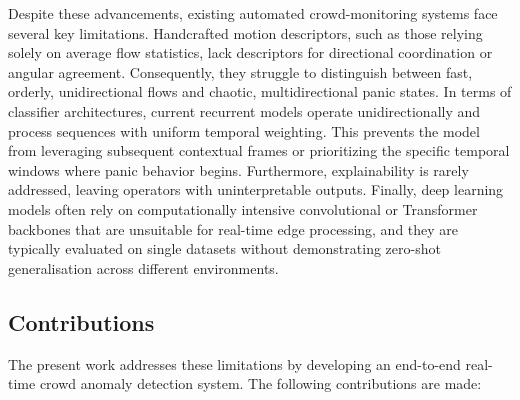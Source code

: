 Despite these advancements, existing automated crowd-monitoring systems face several key limitations. Handcrafted motion descriptors, such as those relying solely on average flow statistics, lack descriptors for directional coordination or angular agreement. Consequently, they struggle to distinguish between fast, orderly, unidirectional flows and chaotic, multidirectional panic states. In terms of classifier architectures, current recurrent models operate unidirectionally and process sequences with uniform temporal weighting. This prevents the model from leveraging subsequent contextual frames or prioritizing the specific temporal windows where panic behavior begins. Furthermore, explainability is rarely addressed, leaving operators with uninterpretable outputs. Finally, deep learning models often rely on computationally intensive convolutional or Transformer backbones that are unsuitable for real-time edge processing, and they are typically evaluated on single datasets without demonstrating zero-shot generalisation across different environments.

\subsection{Contributions}

The present work addresses these limitations by developing an end-to-end real-time crowd anomaly detection system. The following contributions are made:


